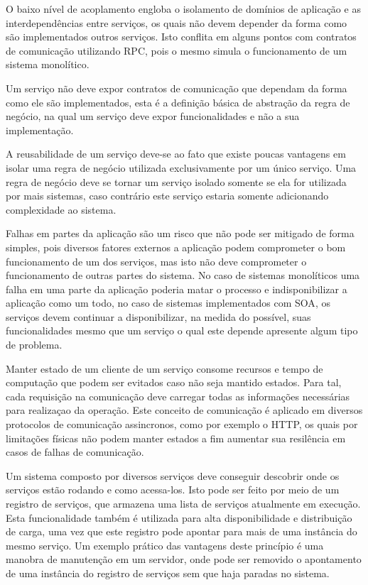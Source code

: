O baixo nível de acoplamento engloba o isolamento de domínios de aplicação e as
interdependências entre serviços, os quais não devem depender da forma como são
implementados outros serviços. Isto conflita em alguns pontos com contratos de
comunicação utilizando \ac{RPC}, pois o mesmo simula o funcionamento de um
sistema monolítico.

Um serviço não deve expor contratos de comunicação que dependam da forma como
ele são implementados, esta é a definição básica de abstração da regra de
negócio, na qual um serviço deve expor funcionalidades e não a sua
implementação.

A reusabilidade de um serviço deve-se ao fato que existe poucas vantagens em
isolar uma regra de negócio utilizada exclusivamente por um único serviço. Uma
regra de negócio deve se tornar um serviço isolado somente se ela for utilizada
por mais sistemas, caso contrário este serviço estaria somente adicionando
complexidade ao sistema.

Falhas em partes da aplicação são um risco que não pode ser mitigado de forma
simples, pois diversos fatores externos a aplicação podem comprometer o bom
funcionamento de um dos serviços, mas isto não deve comprometer o
funcionamento de outras partes do sistema. No caso de sistemas monolíticos
uma falha em uma parte da aplicação poderia matar o processo e indisponibilizar
a aplicação como um todo, no caso de sistemas implementados com \ac{SOA}, os
serviços devem continuar a disponibilizar, na medida do possível, suas
funcionalidades mesmo que um serviço o qual este depende apresente algum tipo
de problema.

Manter estado de um cliente de um serviço consome recursos e tempo de
computação que podem ser evitados caso não seja mantido estados. Para tal,
cada requisição na comunicação deve carregar todas as informações necessárias
para realizaçao da operação. Este conceito de comunicação é aplicado em diversos
protocolos de comunicação assincronos, como por exemplo o \ac{HTTP}, os quais
por limitações físicas não podem manter estados a fim aumentar sua resilência
em casos de falhas de comunicação.

Um sistema composto por diversos serviços deve conseguir descobrir onde os
serviços estão rodando e como acessa-los. Isto pode ser feito por meio de um
registro de serviços, que armazena uma lista de serviços atualmente em execução.
Esta funcionalidade também é utilizada para alta disponibilidade e distribuição
de carga, uma vez que este registro pode apontar para mais de uma instância do
mesmo serviço. Um exemplo prático das vantagens deste princípio é uma manobra
de manutenção em um servidor, onde pode ser removido o apontamento de uma
instância do registro de serviços sem que haja paradas no sistema.

